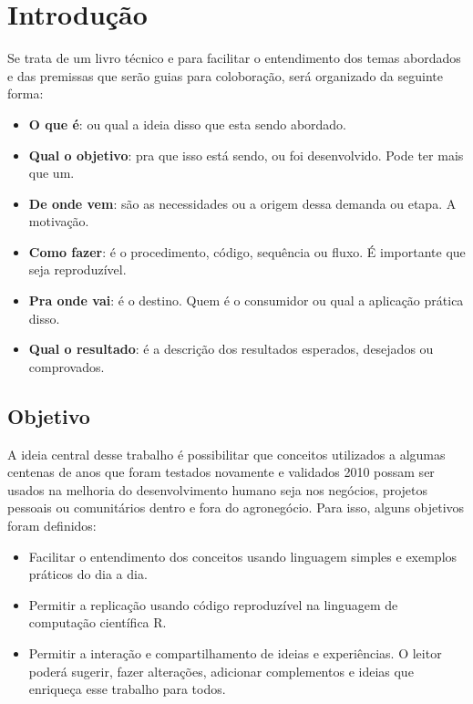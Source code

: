 \documentclass[
]{article}
\providecommand{\tightlist}{%
  \setlength{\itemsep}{0pt}\setlength{\parskip}{0pt}}
\begin{document}
\hypertarget{introduuxe7uxe3o}{%
\section*{Introdução}\label{introduuxe7uxe3o}}

Se trata de um livro técnico e para facilitar o entendimento dos temas abordados e das premissas que serão guias para coloboração, será organizado da seguinte forma:

\begin{itemize}
\tightlist
\item
  \textbf{O que é}: ou qual a ideia disso que esta sendo abordado.
\item
  \textbf{Qual o objetivo}: pra que isso está sendo, ou foi desenvolvido. Pode ter mais que um.
\item
  \textbf{De onde vem}: são as necessidades ou a origem dessa demanda ou etapa. A motivação.
\item
  \textbf{Como fazer}: é o procedimento, código, sequência ou fluxo. É importante que seja reproduzível.
\item
  \textbf{Pra onde vai}: é o destino. Quem é o consumidor ou qual a aplicação prática disso.
\item
  \textbf{Qual o resultado}: é a descrição dos resultados esperados, desejados ou comprovados.
\end{itemize}

\hypertarget{objetivo}{%
\subsection*{Objetivo}\label{objetivo}}

A ideia central desse trabalho é possibilitar que conceitos utilizados a algumas centenas de anos que foram testados novamente e validados 2010 possam ser usados na melhoria do desenvolvimento humano seja nos negócios, projetos pessoais ou comunitários dentro e fora do agronegócio. Para isso, alguns objetivos foram definidos:

\begin{itemize}
\item
  Facilitar o entendimento dos conceitos usando linguagem simples e exemplos práticos do dia a dia.
\item
  Permitir a replicação usando código reproduzível na linguagem de computação científica R.
\item
  Permitir a interação e compartilhamento de ideias e experiências. O leitor poderá sugerir, fazer alterações, adicionar complementos e ideias que enriqueça esse trabalho para todos.
\end{itemize}
\end{document}
